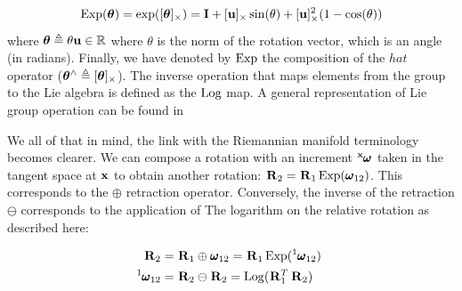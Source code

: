 \begin{equation}
    \operatorname*{Exp}({\bm \theta}) = \exp([{\bm \theta}]_{\times}) = {\bf I} + [{\bf u}]_{\times}\sin(\theta) + [{\bf u}]_{\times}^2(1 - \cos(\theta))
\end{equation}
where ${\bm \theta} \triangleq \theta {\bf u} \in \mathbb{R}$ where $\theta$ is the norm of the rotation vector, which is an angle (in radians).
Finally, we have denoted by $\operatorname*{Exp}$ the composition of the $hat$ operator (${\bm \theta}^\wedge \triangleq [{\bm \theta}]_{\times}$). 
The inverse operation that maps elements from the group to the Lie algebra is defined as the $\operatorname*{Log}$ map. A general representation of
Lie group operation can be found in 

We all of that in mind, the link with the Riemannian manifold terminology becomes clearer. We can compose a rotation with
an increment $\prescript{{\bf x}}{}{\pmb{\omega}}_{}$ taken in the tangent space at ${\bf x}$ to obtain another rotation: $\prescript{}{}{{\bf R}}_{2} = \prescript{}{}{{\bf R}}_{1}\operatorname*{Exp}(\prescript{}{}{\pmb{\omega}}_{12})$.
This corresponds to the $\oplus$ retraction operator. Conversely, the inverse of the retraction $\ominus$ corresponds to the application of The
logarithm on the relative rotation as described here:

\begin{align}
    \Rot{}{2} &= \Rot{}{1}\oplus \angvel{}{12} = \Rot{}{1} \Exp(\angvel{1}{12})  \\ 
    \angvel{1}{12} &= \Rot{}{2}\ominus \Rot{}{2} = \Log(\Rot{}{1}^T\Rot{}{2}) 
\end{align}

